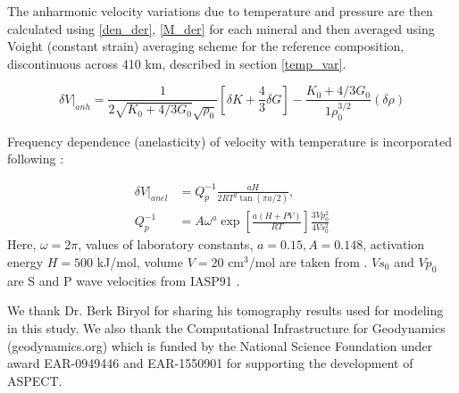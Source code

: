 \documentclass[draft,linenumbers]{agujournal2018}
\begin{document}
The anharmonic velocity variations due to temperature and pressure are then calculated using \ref{den_der}, \ref{M_der} for each mineral and then averaged using Voight (constant strain) averaging scheme for the reference composition, discontinuous across 410 km,  described in section \ref{temp_var}.

\begin{equation} \label{anh}
    \delta V \vert_{anh} = \frac{1}{2\sqrt{K_0 + 4/3 G_0} \sqrt{\rho_0}} \left[\delta K + \frac{4}{3} \delta G \right] - \frac{K_0 + 4/3 G_0}{1\rho_0^{3/2}} ( \delta \rho)
\end{equation} 

Frequency dependence (anelasticity) of velocity with temperature is incorporated following \citet{Goes_2000}:

\begin{align} \label{anel}
    \delta V \vert_{anel} &= Q_p^{-1} \frac{aH}{2 R T^2 \tan(\pi a/2)},\\
    Q_p^{-1} &= A \omega^{a} \exp \left[ \frac{a(H+PV)}{RT} \right] \frac{3Vp_{0}^{2}}{4Vs_{0}^{2}} \nonumber
\end{align}
Here, $\omega = 2\pi $, values of laboratory constants, $a = 0.15, A = 0.148$, activation energy $H = 500$ kJ/mol, volume $V = 20$ cm$^3$/mol are taken from \citet{sobolev1996upper}. $Vs_0$ and $Vp_0$ are S and P wave velocities from IASP91 \citep{kennett1991traveltimes}.



\acknowledgments
We thank Dr. Berk Biryol for sharing his tomography results used for modeling in this study. We also thank the Computational Infrastructure for Geodynamics (geodynamics.org) which is funded by the National Science Foundation under award EAR-0949446 and EAR-1550901 for supporting the development of ASPECT.



%

%





\end{document}

